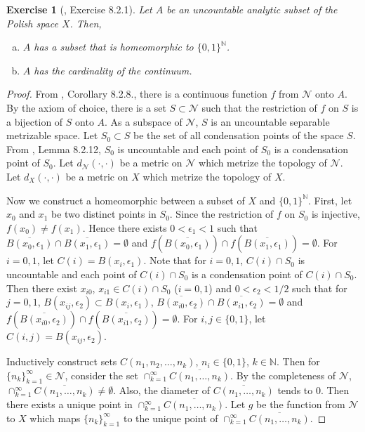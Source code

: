 \documentclass[11pt]{article}
\theoremstyle{plain}
\newtheorem{exercise}{Exercise}
\theoremstyle{definition}
\theoremstyle{remark}
\begin{document}
\begin{exercise}[\cite{book:992991}, Exercise 8.2.1]
        Let $A$ be an uncountable analytic subset of the Polish space $X$.
        Then,
    \begin{enumerate}[(a)]
    \item
        $A$ has a subset that is homeomorphic to $\{0,1\}^{\mathbb N}$.
    \item
        $A$ has the cardinality of the continuum.
    \end{enumerate}
    \label{CohnEx8.2.1}
\end{exercise}
\begin{proof}
    From \cite{book:992991}, Corollary 8.2.8., there is a continuous function $f$ from $\mathscr N$ onto $A$.
    By the axiom of choice, there is a set $S\subset \mathscr N$ such that the restriction of $f$ on $S$ is a bijection of $S$ onto $A$.
    As a subspace of $\mathscr N$, $S$ is an uncountable separable metrizable space.
    Let $S_0\subset S$ be the set of all condensation points of the space $S$.
    From \cite{book:992991}, Lemma 8.2.12, $S_0$ is uncountable and each point of $S_0$ is a condensation point of $S_0$.
    Let $d_{\mathscr N}(\cdot, \cdot)$ be a metric on $\mathscr N$ which metrize the topology of $\mathscr N$.
    Let $d_{X}(\cdot, \cdot)$ be a metric on $X$ which metrize the topology of $X$.

    Now we construct a homeomorphic between a subset of $X$ and $\{0,1\}^{\mathbb N}$.
    First, let $x_0$ and $ x_1 $ be two distinct points in $S_0$.
    Since the restriction of $f$ on $S_0$ is injective, $f(x_0)\neq f(x_1)$.
    Hence there exists $0<\epsilon_1 <1$ such that $\overline{B(x_0,\epsilon_1)} \cap \overline{B(x_1,\epsilon_1)} = \emptyset$ and $ f(\overline{B(x_0,\epsilon_1)}) \cap f(\overline { B(x_1,\epsilon_1)  }) =\emptyset  $. 
    For $i=0,1$, let $C(i)=B(x_i,\epsilon_1)$.
    Note that for $i=0,1$, $C(i) \cap  S_0$ is uncountable and each point of $C(i) \cap  S_0$ is a condensation point of $C(i) \cap  S_0$.
    Then there exist $x_{i0}$, $x_{i1} \in C(i) \cap S_0$ ($i=0,1$) and  $0< \epsilon_2 <1/2$ such that for $j=0,1$, $B(x_{ij},\epsilon_2) \subset B(x_{i},\epsilon_1)$,  $\overline{B(x_{i0},\epsilon_2)} \cap \overline{B(x_{i1},\epsilon_2)} = \emptyset$ and $ f(\overline{B(x_{i0},\epsilon_2)}) \cap f(\overline { B(x_{i1},\epsilon_2)  }) =\emptyset  $. 
    For $i,j\in \{0,1\}$, let $C(i,j)=B(x_{ij}, \epsilon_2)$.
    
    Inductively construct sets $C(n_1,n_2,\ldots,n_k)$, $n_i\in \{0,1\}$, $k\in \mathbb N$.
    Then for $\{n_k\}_{k=1}^\infty \in \mathscr N$, consider the set $\cap_{k=1}^\infty \overline {C(n_1,\dots, n_k)}$.
    By the completeness of $\mathscr N$, $\cap_{k=1}^\infty \overline {C(n_1,\dots, n_k)}\neq \emptyset$.
    Also, the diameter of $\overline {C(n_1,\dots, n_k)}$ tends to $0$.
    Then there exists a unique point in $\cap_{k=1}^\infty \overline {C(n_1,\dots, n_k)}$.
    Let $g$ be the function from $\mathscr N$ to $X$ which maps $\{n_k\}_{k=1}^\infty$ to the unique point of $\cap_{k=1}^\infty \overline {C(n_1,\dots, n_k)}$.


\end{proof}
\end{document}
